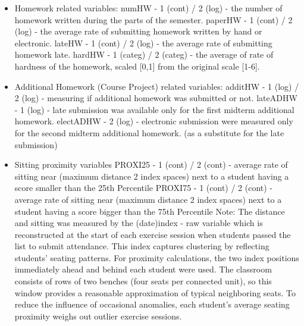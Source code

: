 \documentclass[]{article}
\begin{document}
\begin{itemize}
		\vspace{0.5em}
		Notes:
		 \subitem The amount of DISS after Midterm 1 (2DISS) equals the initial DISS score up to Midterm 1 (1DISS) plus any additional changes observed thereafter — i.e., it records the combination of "old" and "new" behavior.\\
		 \subitem CHEAT denotes observed behaviors during a test that may indicate possible cheating but are not sufficiently serious or conclusive to trigger the university's standard immediate sanctions (automatic fail and one‑year ban on retaking the midterm/exam).\\
		
		\item Homework related variables:
		\subitem numHW - 1 (cont) / 2 (log) - the number of homework written during the parts of the semester.
		\subitem paperHW - 1 (cont) / 2 (log) - the average rate of submitting homework written by hand or electronic.
 		\subitem lateHW - 1 (cont) / 2 (log) - the average rate of submitting homework late.
		\subitem hardHW - 1 (categ) / 2 (categ) - the average of rate of hardness of the homework, scaled [0,1] from the original scale [1-6].
		\item Additional Homework (Course Project) related variables:
		\subitem additHW - 1 (log) / 2 (log) - measuring if additional homework was submitted or not. 
		\subitem lateADHW - 1 (log) - late submission was available only for the first midterm additional homework.
		\subitem electADHW - 2 (log) - electronic submission were measured only for the second midterm additional homework. (as a substitute for the late submission)
		\item Sitting proximity variables
		\subitem PROXI25 - 1 (cont) / 2 (cont) - average rate of sitting near (maximum distance 2 index spaces) next to a student having a score smaller than the 25th Percentile
		\subitem PROXI75 - 1 (cont) / 2 (cont) - average rate of sitting near (maximum distance 2 index spaces) next to a student having a score bigger than the 75th Percentile
		\subitem Note:
		\subsubitem The distance and sitting was measured by the (date)index - raw variable which is reconstructed at the start of each exercise session when students passed the list to submit attendance. This index captures clustering by reflecting students’ seating patterns. For proximity calculations, the two index positions immediately ahead and behind each student were used. The classroom consists of rows of two benches (four seats per connected unit), so this window provides a reasonable approximation of typical neighboring seats. To reduce the influence of occasional anomalies, each student’s average seating proximity weighs out outlier exercise sessions.\\
		

\end{itemize}
\end{document}
